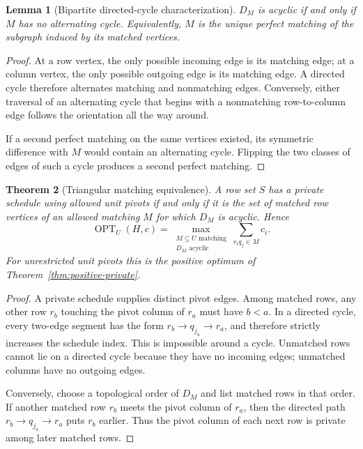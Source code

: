 \documentclass[11pt,a4paper]{article}
\newtheorem{theorem}{Theorem}[section]
\newtheorem{lemma}[theorem]{Lemma}
\theoremstyle{definition}
\theoremstyle{remark}
\newcommand{\OPT}{\operatorname{OPT}}
\begin{document}
\begin{lemma}[Bipartite directed-cycle characterization]
\label{lem:directed}
$D_M$ is acyclic if and only if $M$ has no alternating cycle. Equivalently,
$M$ is the unique perfect matching of the subgraph induced by its matched
vertices.
\end{lemma}
\begin{proof}
At a row vertex, the only possible incoming edge is its matching edge;
at a column vertex, the only possible outgoing edge is its matching edge.
A directed cycle therefore alternates matching and nonmatching edges.
Conversely, either traversal of an alternating cycle that begins with a
nonmatching row-to-column edge follows the orientation all the way around.

If a second perfect matching on the same vertices existed, its symmetric
difference with $M$ would contain an alternating cycle. Flipping the two
classes of edges of such a cycle produces a second perfect matching.
\end{proof}

\begin{theorem}[Triangular matching equivalence]
\label{thm:matching}
A row set $S$ has a private schedule using allowed unit pivots if and only
if it is the set of matched row vertices of an allowed matching $M$ for
which $D_M$ is acyclic. Hence
\begin{equation}
 \OPT_U(H,c)=\max_{\substack{M\subseteq U\text{ matching}\\D_M\text{ acyclic}}}
             \sum_{r_iq_j\in M} c_i.
 \label{eq:matching-opt}
\end{equation}
For unrestricted unit pivots this is the positive optimum of
Theorem~\ref{thm:positive-private}.
\end{theorem}
\begin{proof}
A private schedule supplies distinct pivot edges. Among matched rows,
any other row $r_b$ touching the pivot column of $r_a$ must have $b<a$.
In a directed cycle, every two-edge segment has the form
$r_b\to q_{j_a}\to r_a$, and therefore strictly increases the schedule
index. This is impossible around a cycle. Unmatched rows cannot lie on a
directed cycle because they have no incoming edges; unmatched columns
have no outgoing edges.

Conversely, choose a topological order of $D_M$ and list matched rows in
that order. If another matched row $r_b$ meets the pivot column of $r_a$,
then the directed path $r_b\to q_{j_a}\to r_a$ puts $r_b$ earlier. Thus
the pivot column of each next row is private among later matched rows.
\end{proof}
\end{document}
